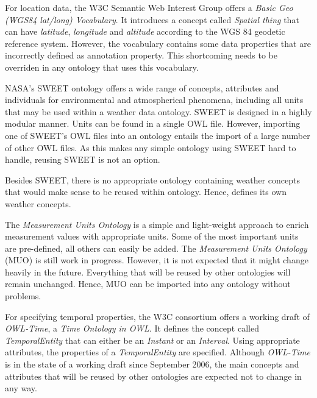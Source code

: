 For location data, the W3C Semantic Web Interest Group offers a \emph{Basic Geo (WGS84 lat/long) Vocabulary}. It introduces a concept called \emph{Spatial thing} that can have \emph{latitude}, \emph{longitude} and \emph{altitude} according to the WGS 84 geodetic reference system. However, the vocabulary contains some data properties that are incorrectly defined as annotation property. This shortcoming needs to be overriden in any ontology that uses this vocabulary.

NASA's SWEET ontology offers a wide range of concepts, attributes and individuals for environmental and atmospherical phenomena, including all units that may be used within a weather data ontology. SWEET is designed in a highly modular manner. Units can be found in a single OWL file. However, importing one of SWEET's OWL files into an ontology entails the import of a large number of other OWL files. As this makes any simple ontology using SWEET hard to handle, reusing SWEET is not an option.

Besides SWEET, there is no appropriate ontology containing weather concepts that would make sense to be reused within \thinkhomeweather ontology. Hence, \thinkhomeweather defines its own weather concepts.

The \emph{Measurement Units Ontology} is a simple and light-weight approach to enrich measurement values with appropriate units. Some of the most important units are pre-defined, all others can easily be added. The \emph{Measurement Units Ontology} (MUO) is still work in progress. However, it is not expected that it might change heavily in the future. Everything that will be reused by other ontologies will remain unchanged. Hence, MUO can be imported into any ontology without problems.

For specifying temporal properties, the W3C consortium offers a working draft of \emph{OWL-Time}, a \emph{Time Ontology in OWL}. It defines the concept called \emph{TemporalEntity} that can either be an \emph{Instant} or an \emph{Interval}. Using appropriate attributes, the properties of a \emph{TemporalEntity} are specified. Although \emph{OWL-Time} is in the state of a working draft since September 2006, the main concepts and attributes that will be reused by other ontologies are expected not to change in any way.

